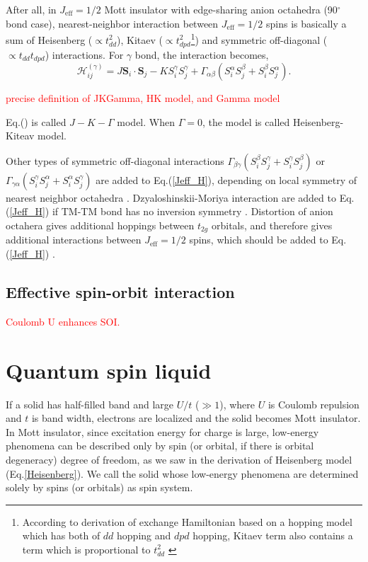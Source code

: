 After all, in $J_\mathrm{eff} = 1/2$ Mott insulator with edge-sharing anion octahedra (90$^\circ$ bond case), nearest-neighbor interaction between $J_\mathrm{eff} = 1/2$ spins is basically a sum of Heisenberg ($\propto t_{dd}^2$), Kitaev ($\propto t_{dpd}^2$\footnote{According to derivation of exchange Hamiltonian based on a hopping model which has both of $dd$ hopping and $dpd$ hopping, Kitaev term also contains a term which is proportional to $t_{dd}^2$ \cite{}}) and symmetric off-diagonal ($\propto t_{dd}t_{dpd}$) interactions.
For $\gamma$ bond, the interaction becomes,
\begin{equation}
\mathcal{H}^{(\gamma)}_{ij} = J\bm{S}_i\cdot\bm{S}_j-KS^\gamma_iS^\gamma_j + \Gamma_{\alpha\beta}(S^\alpha_iS^\beta_j + S^\beta_iS^\alpha_j).
\label{Jeff_H}
\end{equation}

\textcolor{red}{precise definition of JKGamma, HK model, and Gamma model}

Eq.(\label{Jeff_H}) is called $J-K-\Gamma$ model.
When $\Gamma = 0$, the model is called Heisenberg-Kiteav model.

Other types of symmetric off-diagonal interactions $\Gamma_{\beta\gamma}(S^\beta_iS^\gamma_j + S^\gamma_iS^\beta_j)$ or $\Gamma_{\gamma\alpha}(S^\gamma_iS^\alpha_j + S^\alpha_iS^\gamma_j)$ are added to Eq.(\ref{Jeff_H}), depending on local symmetry of nearest neighbor octahedra \cite{}.
Dzyaloshinskii-Moriya interaction are added to Eq.(\ref{Jeff_H}) if TM-TM bond has no inversion symmetry \cite{}.
Distortion of anion octahera gives additional hoppings between $t_{2g}$ orbitals, and therefore gives additional interactions between $J_\mathrm{eff} = 1/2$ spins, which should be added to Eq.(\ref{Jeff_H}) \cite{}.

\subsection{Effective spin-orbit interaction}
\textcolor{red}{Coulomb U enhances SOI.}


\section{Quantum spin liquid}
\label{QSL}
If a solid has half-filled band and large $U/t$ ($\gg 1$), where $U$ is Coulomb repulsion and $t$ is band width, electrons are localized and the solid becomes Mott insulator.
In Mott insulator, since excitation energy for charge is large, low-energy phenomena can be described only by spin (or orbital, if there is orbital degeneracy) degree of freedom, as we saw in the derivation of Heisenberg model (Eq.\ref{Heisenberg}).
We call the solid whose low-energy phenomena are determined solely by spins (or orbitals) as spin system.

